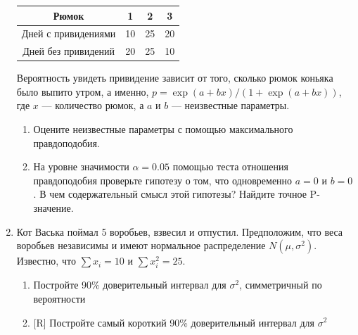 \documentclass[12pt, a4paper]{article}\usepackage[]{graphicx}\usepackage[]{color}
\begin{document}
\begin{enumerate}
					\begin{tabular}{c|ccc}
						Рюмок & 1 & 2 & 3 \\
						\hline
						Дней с привидениями & 10 & 25 & 20 \\
						Дней без привидений & 20 &  25 & 10 \\
					\end{tabular}

					Вероятность увидеть привидение зависит от того, сколько рюмок коньяка было выпито утром, а именно, $p=\exp(a+bx)/(1+ \exp(a+bx))$, где $x$ — количество рюмок, а $a$ и $b$ — неизвестные параметры.

					\begin{enumerate}
						\item Оцените неизвестные параметры с помощью максимального правдоподобия.
						\item На уровне значимости $\alpha=0.05$ помощью теста отношения правдоподобия проверьте гипотезу о том, что одновременно $a=0$ и $b=0$. В чем содержательный смысл этой гипотезы? Найдите точное P-значение.
					\end{enumerate}




					\item Кот Васька поймал 5 воробьев, взвесил и отпустил. Предположим, что веса воробьев независимы и имеют нормальное распределение $N(\mu,\sigma^2)$. Известно, что $\sum x_i=10$ и $\sum x_i^2=25$.
					\begin{enumerate}
						\item Постройте 90\% доверительный интервал для $\sigma^2$, симметричный по вероятности
						\item $[$R]  Постройте самый короткий 90\% доверительный интервал для $\sigma^2$
					\end{enumerate}



\end{enumerate}
\end{document}
